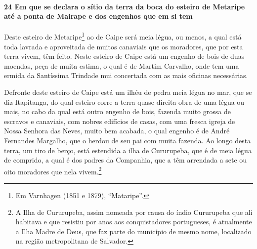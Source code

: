 \begin{linenumbers}
\paragraph{24 Em que se declara o sítio da terra da boca do esteiro de Metaripe até a
ponta de Mairape e dos engenhos que em si tem}\quad
Deste esteiro de Metaripe\footnote{ Em Varnhagen (1851 e 1879), ``Mataripe''.} ao de Caipe
será meia légua, ou menos, a qual está toda lavrada e aproveitada de muitos canaviais que
os moradores, que por esta terra vivem, têm feito. Neste esteiro de Caipe está um engenho
de bois de duas moendas, peça de muita estima, o qual é de Martim Carvalho, onde tem uma
ermida da Santíssima Trindade mui concertada com as mais oficinas necessárias.

Defronte deste esteiro de Caipe está um ilhéu de pedra meia légua no mar, que se diz
Itapitanga, do qual esteiro corre a terra quase direita obra de uma légua ou mais, no cabo
da qual está outro engenho de bois, fazenda muito grossa de escravos e canaviais, com
nobres edifícios de casas, com uma fresca igreja de Nossa Senhora das Neves, muito bem
acabada, o qual engenho é de André Fernandes Margalho, que o herdou de seu pai com muita
fazenda. Ao longo desta terra, um tiro de berço, está estendida a ilha de Cururupeba, que
é de meia légua de comprido, a qual é dos padres da Companhia, que a têm arrendada a sete
ou oito moradores que nela vivem.\footnote{ A Ilha de Cururupeba, assim nomeada por causa
do índio Cururupeba que ali habitava e que resistiu por anos aos conquistadores
portugueses, é atualmente a Ilha Madre de Deus, que faz parte do município de mesmo nome,
localizado na região metropolitana de Salvador.}


\end{linenumbers}

